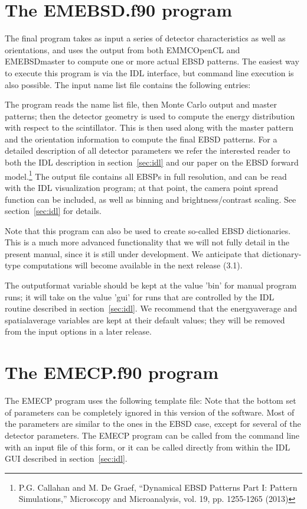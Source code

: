 \documentclass[DIV=calc, paper=letter, fontsize=11pt]{scrartcl}	 %
\begin{document}
\section{The \protect\textsf{EMEBSD.f90} program\label{sec:f90EBSD}}
The final program takes as input a series of detector characteristics as well as orientations, and uses the output from both \textsf{EMMCOpenCL} and
\textsf{EMEBSDmaster} to compute one or more actual EBSD patterns.  
The easiest way to execute this program is via the IDL interface, but command line execution is also possible.  
The input name list file contains the following entries:

The program reads the name list file, then Monte Carlo output and master patterns;  then the detector geometry is used to
compute the energy distribution with respect to the scintillator.  This is then used along with the master pattern and the 
orientation information to compute the final EBSD patterns.  For a detailed description of all detector parameters we 
refer the interested reader to both the IDL description in section~\ref{sec:idl} and our paper on the EBSD forward model.\footnote{P.G. Callahan and M. De Graef, 
``Dynamical EBSD Patterns Part I: Pattern Simulations,'' Microscopy and Microanalysis, vol. 19, pp. 1255-1265 (2013)}
The output file contains all EBSPs in full resolution,
and can be read with the IDL visualization program; at that point, the camera point spread function can be included, as well
as binning and brightness/contrast scaling. See section~\ref{sec:idl} for details.

Note that this program can also be used to create so-called EBSD dictionaries.  This is a much more advanced functionality 
that we will not fully detail in the present manual, since it is still under development.  We anticipate that dictionary-type 
computations will become available in the next release (3.1).

The \textsf{outputformat} variable should be kept at the value \textsf{'bin'} for manual program runs; it will take on 
the value \textsf{'gui'} for runs that are controlled by the IDL routine described in section~\ref{sec:idl}.  We recommend
that the \textsf{energyaverage} and \textsf{spatialaverage} variables are kept at their default values; they will be removed 
from the input options in a later release.

\section{The \protect\textsf{EMECP.f90} program\label{sec:f90ECP}}
The \textsf{EMECP} program uses the following template file:
Note that the bottom set of parameters can be completely ignored in this version of the software.  Most of the parameters 
are similar to the ones in the EBSD case, except for several of the detector parameters.  The \textsf{EMECP} program
can be called from the command line with an input file of this form, or it can be called directly from within the IDL GUI
described in section~\ref{sec:idl}.  
\end{document}
